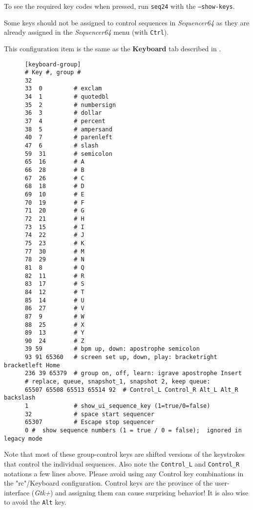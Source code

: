    To see the required key codes when pressed, run \texttt{seq24} with
   the \texttt{--show-keys}.

   Some keys should not be assigned to control sequences in
   \textsl{Sequencer64} as they are already assigned in the
   \textsl{Sequencer64} menu (with \texttt{Ctrl}). 

   This configuration item is the same as the 
   \textbf{Keyboard} tab described in
   .

   \begin{verbatim}
      [keyboard-group]
      # Key #, group # 
      32
      33  0         # exclam
      34  1         # quotedbl
      35  2         # numbersign
      36  3         # dollar
      37  4         # percent
      38  5         # ampersand
      40  7         # parenleft
      47  6         # slash
      59  31        # semicolon
      65  16        # A
      66  28        # B
      67  26        # C
      68  18        # D
      69  10        # E
      70  19        # F
      71  20        # G
      72  21        # H
      73  15        # I
      74  22        # J
      75  23        # K
      77  30        # M
      78  29        # N
      81  8         # Q
      82  11        # R
      83  17        # S
      84  12        # T
      85  14        # U
      86  27        # V
      87  9         # W
      88  25        # X
      89  13        # Y
      90  24        # Z
      39 59         # bpm up, down: apostrophe semicolon
      93 91 65360   # screen set up, down, play: bracketright bracketleft Home
      236 39 65379  # group on, off, learn: igrave apostrophe Insert
      # replace, queue, snapshot_1, snapshot 2, keep queue:
      65507 65508 65513 65514 92  # Control_L Control_R Alt_L Alt_R backslash
      1             # show_ui_sequence_key (1=true/0=false)
      32            # space start sequencer
      65307         # Escape stop sequencer
      0 #  show sequence numbers (1 = true / 0 = false);  ignored in legacy mode
   \end{verbatim}

   Note that most of these group-control keys are shifted versions of the
   keystrokes that control the individual sequences.  Also note the
   \texttt{Control\_L} and \texttt{Control\_R} notations a few lines above.
   Please avoid using any Control key combinations in the "rc"/Keyboard
   configuration.  Control keys are the province of the user-interface
   (\textsl{Gtk+}) and assigning them can cause surprising behavior!
   It is also wise to avoid the \texttt{Alt} key.


